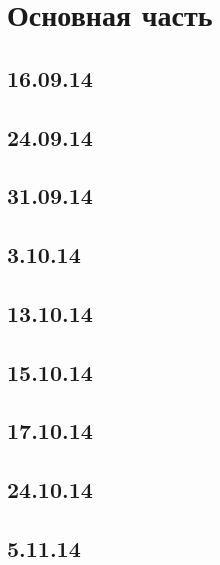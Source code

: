 \documentclass[11pt]{article}
\begin{document}
		

	
	
	\section{Основная часть}
	
	\subsection{16.09.14}
	
	
	\subsection{24.09.14}
	

	\subsection{31.09.14}
	

	\subsection{3.10.14}
	
	
	\subsection{13.10.14}
	
	
	\subsection{15.10.14}
	
	
	\subsection{17.10.14}
	

	\subsection{24.10.14}
		
	
	\subsection{5.11.14}
		
\end{document}
